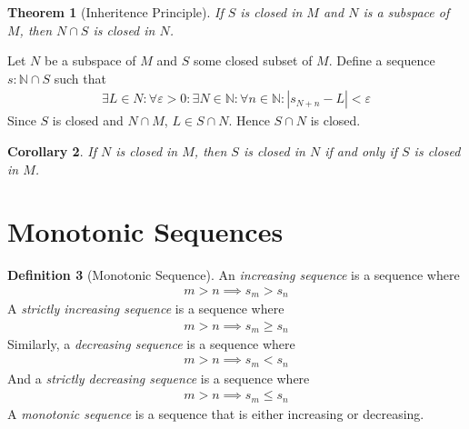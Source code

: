 \documentclass{amsart}
\numberwithin{equation}{section}
\let\oldendproof\endproof
\renewenvironment{proof}[1][\proofname]{%
  \setcounter{case}{0}
  \setcounter{step}{0}
  \oldproof[#1]%
}{\oldendproof}
\theoremstyle{plain}
\newtheorem{theorem}{Theorem}[section]
\newtheorem{corollary}[theorem]{Corollary}
\theoremstyle{definition}
\newtheorem{definition}[theorem]{Definition}
\theoremstyle{remark}
\begin{document}
\begin{theorem}[Inheritence Principle]
  If $S$ is closed in $M$ and $N$ is a subspace of $M$, then $N\cap S$ is closed in $N$.
\end{theorem}
\begin{proof}
  Let $N$ be a subspace of $M$ and $S$ some closed subset of $M$. Define a sequence $s:\mathbb{N} \cap S$ such that
  \begin{align}
    \exists L \in N: \forall \varepsilon >0: \exists N \in \mathbb{N}: \forall n \in \mathbb{N}: |s_{N+n}- L | < \varepsilon
  \end{align}
  Since $S$ is closed and $N\cap M$, $L\in S\cap N$. Hence $S\cap N $ is closed.
\end{proof}

\begin{corollary}
  If $N$ is closed in $M$, then $S$ is closed in $N$ if and only if $S$ is closed in $M$.
\end{corollary}


\section{Monotonic Sequences}


\begin{definition}[Monotonic Sequence]
  An \emph{increasing sequence} is a sequence where
  \begin{align}
    m > n \implies s_m > s_n
  \end{align}
  A \emph{strictly increasing sequence} is a sequence where
  \begin{align}
    m > n \implies s_m \geq s_n
  \end{align}
  Similarly, a \emph{decreasing sequence} is a sequence where
  \begin{align}
    m > n \implies s_m < s_n
  \end{align}
  And a \emph{strictly decreasing sequence} is a sequence where
  \begin{align}
    m > n \implies s_m \leq s_n
  \end{align}
  A \emph{monotonic sequence} is a sequence that is either increasing or decreasing.
\end{definition}
\end{document}
